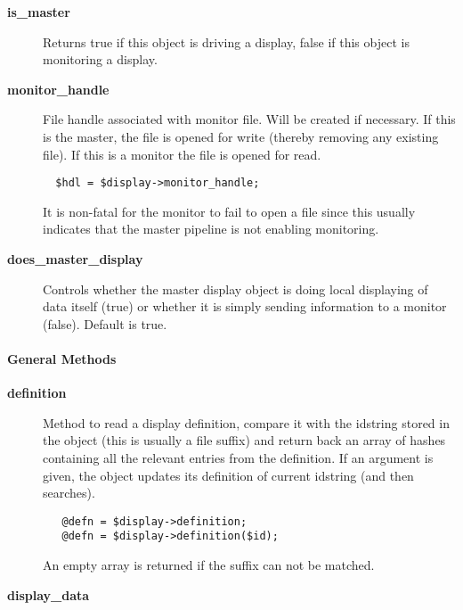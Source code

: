 \begin{description}
\begin{description}
\item[{\textbf{is\_master}}] \mbox{}

Returns true if this object is driving a display, false if this object is monitoring
a display.


\item[{\textbf{monitor\_handle}}] \mbox{}

File handle associated with monitor file. Will be created if
necessary.  If this is the master, the file is opened for write
(thereby removing any existing file). If this is a monitor the file is
opened for read.

\begin{verbatim}
  $hdl = $display->monitor_handle;
\end{verbatim}


It is non-fatal for the monitor to fail to open a file since this usually
indicates that the master pipeline is not enabling monitoring.


\item[{\textbf{does\_master\_display}}] \mbox{}

Controls whether the master display object is doing local displaying of data
itself (true) or whether it is simply sending information to a monitor (false).
Default is true.

\end{description}
\paragraph*{General Methods\label{ORAC::Display_General_Methods}}
\begin{description}

\item[{\textbf{definition}}] \mbox{}

Method to read a display definition, compare it with the idstring
stored in the object (this is usually a file suffix)
and return back an array of  hashes containing all the relevant entries
from the definition. If an argument is given, the object updates
its definition of current idstring (and then searches).

\begin{verbatim}
   @defn = $display->definition;
   @defn = $display->definition($id);
\end{verbatim}


An empty array is returned if the suffix can not be matched.


\item[{\textbf{display\_data}}] \mbox{}


\end{description}
\end{description}
